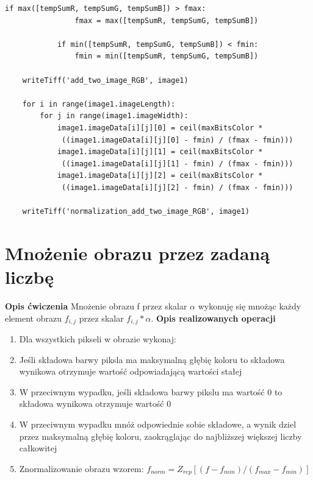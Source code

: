 \documentclass[magisterska,openany]{pracadypl}
\begin{document}
\begin{lstlisting}[caption={Sumowanie dwóch obrazów barwowych}]
            if max([tempSumR, tempSumG, tempSumB]) > fmax:
                fmax = max([tempSumR, tempSumG, tempSumB])

            if min([tempSumR, tempSumG, tempSumB]) < fmin:
                fmin = min([tempSumR, tempSumG, tempSumB])

    writeTiff('add_two_image_RGB', image1)

    for i in range(image1.imageLength):
        for j in range(image1.imageWidth):
            image1.imageData[i][j][0] = ceil(maxBitsColor *
             ((image1.imageData[i][j][0] - fmin) / (fmax - fmin)))
            image1.imageData[i][j][1] = ceil(maxBitsColor *
             ((image1.imageData[i][j][1] - fmin) / (fmax - fmin)))
            image1.imageData[i][j][2] = ceil(maxBitsColor *
             ((image1.imageData[i][j][2] - fmin) / (fmax - fmin)))

    writeTiff('normalization_add_two_image_RGB', image1)

\end{lstlisting}
\newpage


\section{Mnożenie obrazu przez zadaną liczbę}

\vspace{0.5cm}\textbf{\Large Opis ćwiczenia}
\vspace{0.25cm}\newline
Mnożenie obrazu f przez skalar $\alpha$ wykonuję się mnożąc każdy element obrazu $f_{i,j}$ przez skalar $f_{i,j}*\alpha$.
\newline
\newline
\textbf{\Large Opis realizowanych operacji}
\begin{enumerate}
\item Dla wszystkich pikseli w obrazie wykonaj:  
\item Jeśli składowa barwy piksla ma maksymalną głębię koloru to składowa wynikowa otrzymuje wartość odpowiadającą wartości stałej
\item W przeciwnym wypadku, jeśli składowa barwy pikslu ma wartość 0 to składowa wynikowa otrzymuje wartość 0
\item W przeciwnym wypadku mnóż odpowiednie sobie składowe, a wynik dziel przez maksymalną głębię koloru, zaokrąglając do najbliższej większej liczby całkowitej
\item Znormalizowanie obrazu wzorem:
\newline $f_{norm}=Z_{rep}[(f-f_{min})/(f_{max}-f_{min})]$
\end{enumerate}
\end{document}
